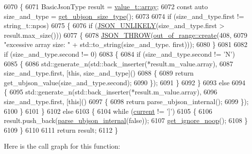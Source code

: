 \begin{DoxyCode}
6070     \{
6071         BasicJsonType result = \hyperlink{namespacenlohmann_1_1detail_a1ed8fc6239da25abcaf681d30ace4985af1f713c9e000f5d3f280adbd124df4f5}{value\_t::array};
6072         \textcolor{keyword}{const} \textcolor{keyword}{auto} size\_and\_type = \hyperlink{classnlohmann_1_1detail_1_1binary__reader_a480aae640bb92a7432c0f758081a2cc7}{get\_ubjson\_size\_type}();
6073 
6074         \textcolor{keywordflow}{if} (size\_and\_type.first != string\_t::npos)
6075         \{
6076             \textcolor{keywordflow}{if} (\hyperlink{json_8hpp_ab77582407c64944e7db1ea95ab520253}{JSON\_UNLIKELY}(size\_and\_type.first > result.max\_size()))
6077             \{
6078                 \hyperlink{json_8hpp_a6c274f6db2e65c1b66c7d41b06ad690f}{JSON\_THROW}(\hyperlink{classnlohmann_1_1detail_1_1out__of__range_a3f6d82a6f967c4728a1ec735a7867073}{out\_of\_range::create}(408,
6079                                                 \textcolor{stringliteral}{"excessive array size: "} + std::to\_string(size\_and\_type.
      first)));
6080             \}
6081 
6082             \textcolor{keywordflow}{if} (size\_and\_type.second != 0)
6083             \{
6084                 \textcolor{keywordflow}{if} (size\_and\_type.second != \textcolor{charliteral}{'N'})
6085                 \{
6086                     std::generate\_n(std::back\_inserter(*result.m\_value.array),
6087                                     size\_and\_type.first, [\textcolor{keyword}{this}, size\_and\_type]()
6088                     \{
6089                         return get\_ubjson\_value(size\_and\_type.second);
6090                     \});
6091                 \}
6092             \}
6093             \textcolor{keywordflow}{else}
6094             \{
6095                 std::generate\_n(std::back\_inserter(*result.m\_value.array),
6096                                 size\_and\_type.first, [\textcolor{keyword}{this}]()
6097                 \{
6098                     return parse\_ubjson\_internal();
6099                 \});
6100             \}
6101         \}
6102         \textcolor{keywordflow}{else}
6103         \{
6104             \textcolor{keywordflow}{while} (\hyperlink{classnlohmann_1_1detail_1_1binary__reader_a7e994e201b215cd6d6ae28a1853f43e0}{current} != \textcolor{charliteral}{']'})
6105             \{
6106                 result.push\_back(\hyperlink{classnlohmann_1_1detail_1_1binary__reader_a439e369278be4412b05f3481c226eafa}{parse\_ubjson\_internal}(\textcolor{keyword}{false}));
6107                 \hyperlink{classnlohmann_1_1detail_1_1binary__reader_a372a4b61f0c57f3d4f1e9484a416a3cd}{get\_ignore\_noop}();
6108             \}
6109         \}
6110 
6111         \textcolor{keywordflow}{return} result;
6112     \}
\end{DoxyCode}
Here is the call graph for this function\+:
\mbox{\label{classnlohmann_1_1detail_1_1binary__reader_a8fd127298effd88e0d42f5b70cb5791b}} 
